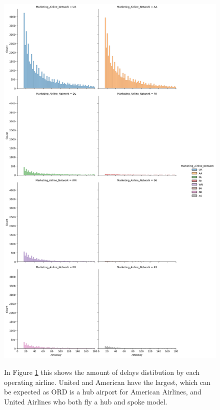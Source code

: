 \documentclass[a4paper,12pt]{article}
\begin{document}
\begin{figure}
    \centering
    \includegraphics*[scale=.35]{../../img/delays_by_airline.png}
    \caption[]{}
    \label{fig:delaybyairline}
    In Figure \ref{fig:delaybyairline} this shows the amount of delays distibution by each operating airline. United and American have the largest,
    which can be expected as ORD is a hub airport for American Airlines, and United Airlines who both fly a hub and spoke model. 
\end{figure}
\end{document}
